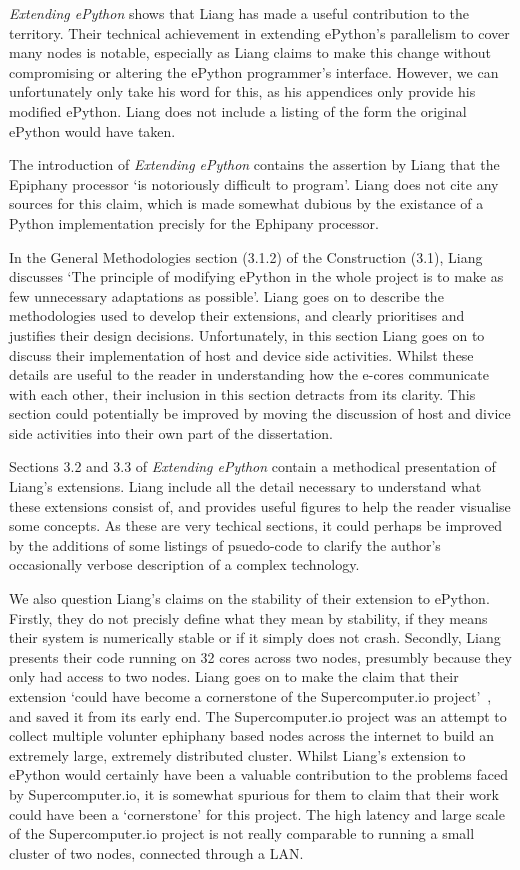 \documentclass{report}
\begin{document}
 \textit{Extending ePython} shows that Liang has made a useful contribution to the territory. Their technical achievement in extending ePython's parallelism to cover many nodes is notable, especially as Liang claims to make this change without compromising or altering the ePython programmer's interface. However, we can unfortunately only take his word for this, as his appendices only provide his modified ePython. Liang does not include a listing of the form the original ePython would have taken.

 The introduction of \textit{Extending ePython} contains the assertion by Liang that the Epiphany processor `is  notoriously  difficult  to  program'. Liang does not cite any sources for this claim, which is made somewhat dubious by the existance of a Python implementation precisly for the Ephipany processor.

 In the General Methodologies section (3.1.2) of the Construction (3.1), Liang discusses  `The principle of modifying ePython in the whole project is to make as few unnecessary adaptations as possible'. Liang goes on to describe the methodologies used to develop their extensions, and clearly prioritises and justifies their design decisions. Unfortunately, in this section Liang goes on to  discuss their implementation of host and device side activities. Whilst these details are useful to the reader in understanding how the e-cores communicate with each other, their inclusion in this section detracts from its clarity. This section could potentially be improved by moving the discussion of host and divice side activities into their own part of the dissertation.

 Sections 3.2 and 3.3 of \textit{Extending ePython} contain a methodical presentation of Liang's extensions. Liang include all the detail necessary to understand what these extensions consist of, and provides useful figures to help the reader visualise some concepts. As these are very techical sections, it could perhaps be improved by the additions of some listings of psuedo-code to clarify the author's occasionally verbose description of a complex technology.

 We also question Liang's claims on the stability of their extension to ePython. Firstly, they do not precisly define what they mean by stability, if they means their system is numerically stable or if it simply does not crash. Secondly, Liang presents their code running on 32 cores across two nodes, presumbly because they only had access to two nodes. Liang goes on to make the claim that their extension `could have become a cornerstone of the Supercomputer.io project'~\cite{Liang2017}, and saved it from its early end. The Supercomputer.io project was an attempt to collect multiple volunter ephiphany based nodes across the internet to build an extremely large, extremely distributed cluster. Whilst Liang's extension to ePython would certainly have been a valuable contribution to the problems faced by Supercomputer.io, it is somewhat spurious for them to claim that their work could have been a `cornerstone' for this project. The high latency and large scale of the Supercomputer.io project is not really comparable to running a small cluster of two nodes, connected through a LAN.
\end{document}
